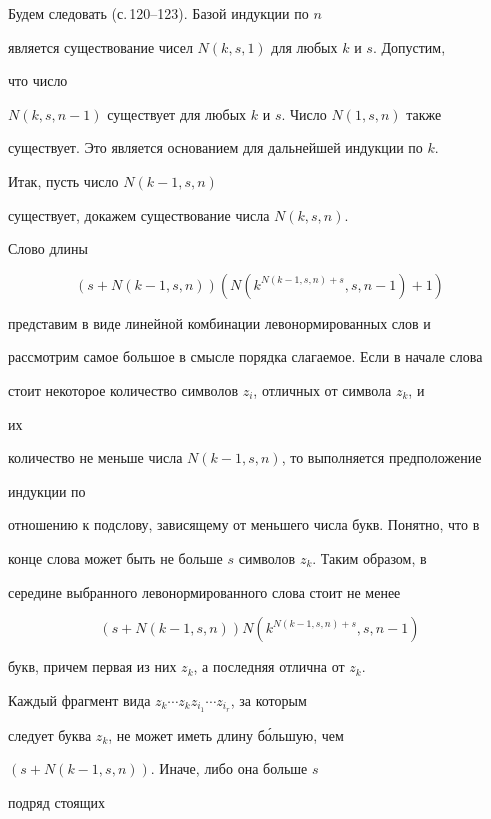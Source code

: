 \begin{pf}


Будем следовать \cite{4} (с.\,120--123). Базой индукции по $n$


является существование чисел $N(k,s,1)$ для любых $k$ и $s$. Допустим,


что число


$N(k,s,n-1)$ существует для любых $k$ и $s$. Число $N(1,s,n)$ также


существует. Это является основанием для дальнейшей индукции по $k$.


Итак, пусть число $N(k-1,s,n)$


существует, докажем существование числа $N(k,s,n)$.





Слово длины


$$


(s+N(k-1,s,n))(N(k^{N(k-1,s,n)+s},s,n-1)+1)


$$


представим в виде линейной комбинации левонормированных слов и


рассмотрим самое большое в смысле порядка слагаемое. Если в начале слова


стоит некоторое количество символов $z_i$, отличных от символа $z_k$, и


их


количество не меньше числа $N(k-1,s,n)$, то выполняется предположение


индукции по


отношению к подслову, зависящему от меньшего числа букв. Понятно, что в


конце слова может быть не больше $s$ символов $z_k$. Таким образом, в


середине выбранного левонормированного слова стоит не менее


$$


(s+N(k-1,s,n))N(k^{N(k-1,s,n)+s},s,n-1)


$$


букв, причем первая из них $z_k$, а последняя отлична от $z_k$.





Каждый фрагмент вида $z_k\dotsb z_k z_{i_1}\dotsb z_{i_r}$, за которым


следует буква $z_k$, не может иметь длину б\'ольшую, чем


$(s+N(k-1,s,n))$. Иначе, либо она больше $s$


подряд стоящих



\end{pf}
